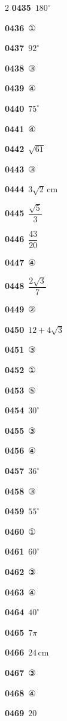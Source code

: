 \documentclass[10pt,a4paper]{article}
\begin{document}
\begin{multicols}{2}
\noindent\textbf{0435}\ $180^\circ$\par
\noindent\textbf{0436}\ ①\par
\noindent\textbf{0437}\ $92^\circ$\par
\noindent\textbf{0438}\ ③\par
\noindent\textbf{0439}\ ④\par
\noindent\textbf{0440}\ $75^\circ$\par
\noindent\textbf{0441}\ ④\par
\noindent\textbf{0442}\ $\sqrt{61}$\par
\noindent\textbf{0443}\ ③\par
\noindent\textbf{0444}\ $3\sqrt{2}\,\mathrm{cm}$\par
\noindent\textbf{0445}\ $\dfrac{\sqrt{5}}{3}$\par
\noindent\textbf{0446}\ $\dfrac{43}{20}$\par
\noindent\textbf{0447}\ ④\par
\noindent\textbf{0448}\ $\dfrac{2\sqrt{3}}{7}$\par
\noindent\textbf{0449}\ ②\par
\noindent\textbf{0450}\ $12+4\sqrt{3}$\par
\noindent\textbf{0451}\ ③\par
\noindent\textbf{0452}\ ①\par
\noindent\textbf{0453}\ ⑤\par
\noindent\textbf{0454}\ $30^\circ$\par
\noindent\textbf{0455}\ ③\par
\noindent\textbf{0456}\ ④\par
\noindent\textbf{0457}\ $36^\circ$\par
\noindent\textbf{0458}\ ③\par
\noindent\textbf{0459}\ $55^\circ$\par
\noindent\textbf{0460}\ ①\par
\noindent\textbf{0461}\ $60^\circ$\par
\noindent\textbf{0462}\ ③\par
\noindent\textbf{0463}\ ④\par
\noindent\textbf{0464}\ $40^\circ$\par
\noindent\textbf{0465}\ $7\pi$\par
\noindent\textbf{0466}\ $24\,\mathrm{cm}$\par
\noindent\textbf{0467}\ ③\par
\noindent\textbf{0468}\ ④\par
\noindent\textbf{0469}\ $20$\par

\end{multicols}
\end{document}
